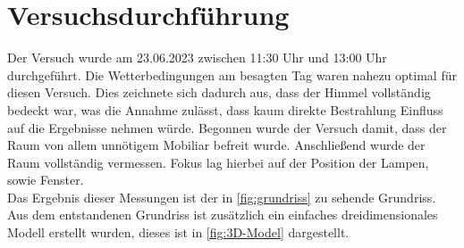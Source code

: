 \section{Versuchsdurchführung}
\label{section:Versuchsdurchführung}
Der Versuch wurde am 23.06.2023 zwischen 11:30 Uhr und 13:00 Uhr durchgeführt. 
Die Wetterbedingungen am besagten Tag waren nahezu optimal für diesen Versuch. 
Dies zeichnete sich dadurch aus, dass der Himmel vollständig bedeckt war, was die 
Annahme zulässt, dass kaum direkte Bestrahlung Einfluss auf die Ergebnisse nehmen würde. 
Begonnen wurde der Versuch damit, dass der Raum von allem unnötigem Mobiliar befreit wurde.
Anschließend wurde der Raum vollständig vermessen. Fokus lag hierbei auf der Position 
der Lampen, sowie Fenster.\\
Das Ergebnis dieser Messungen ist der in \autoref{fig:grundriss} zu sehende Grundriss.
Aus dem entstandenen Grundriss ist zusätzlich ein einfaches dreidimensionales Modell erstellt wurden,
dieses ist in \autoref{fig:3D-Model} dargestellt.

